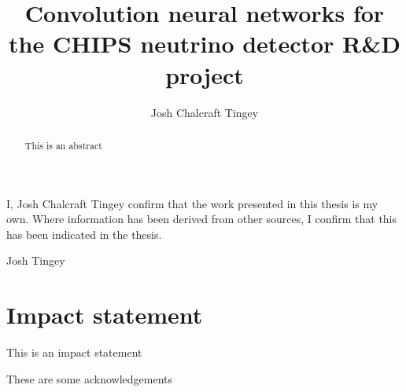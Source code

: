 
\title{Convolution neural networks for the CHIPS neutrino detector R\&D project}
\author{Josh Chalcraft Tingey}

\thispagestyle{plain}

\begin{declaration} %
    I, Josh Chalcraft Tingey confirm that the work presented in this thesis is my own. Where
    information has been derived from other sources, I confirm that this has been indicated in the
    thesis.
    \vspace*{1cm}
    \begin{flushright}
        Josh Tingey
    \end{flushright}
\end{declaration}

\begin{abstract} %
    This is an abstract
\end{abstract}

\chapter*{\centering Impact statement}
This is an impact statement

\begin{acknowledgements} %
    These are some acknowledgements
\end{acknowledgements}

\tableofcontents %
\listoffigures %
\listoftables %